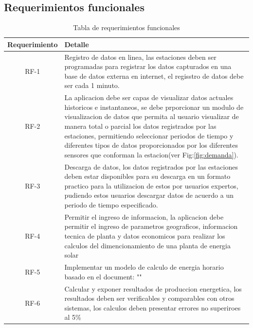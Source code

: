 \subsection{Requerimientos funcionales}
\begin{table}[h!]
\caption{Tabla de requerimientos funcionales}
\begin{tabular}{| c | p{11cm} |}
	\hline
	\textbf{Requerimiento}	&	\textbf{Detalle}	\\
	\hline
	RF-1	&	Registro de datos en linea, las estaciones deben ser programadas para registrar los datos capturados en una base de datos externa en internet, el regisstro de datos debe ser cada 1 minuto.	\\
	\hline
	RF-2	&	La aplicacion debe ser capas de visualizar datos actuales historicos e instantaneos, se debe prporcionar un modulo de visualizacion de datos que permita al usuario visualizar de manera total o parcial los datos registrados por las estaciones, permitiendo seleccionar periodos de tiempo y diferentes tipos de datos proporcionados por los diferentes sensores que conforman la estacion(ver Fig:\ref{fig:demanda}). 	\\
	\hline
	RF-3	&	Descarga de datos, los datos registrados por las estaciones deben estar disponibles para su descarga en un formato practico para la utilizacion de estos por usuarios expertos, pudiendo estos usuarios descargar datos de acuerdo a un periodo de tiempo especificado.	\\
	\hline
	RF-4	&	Permitir el ingreso de informacion, la aplicacion debe permitir el ingreso de parametros geograficos, informacion tecnica de planta y datos economicos para realizar los calculos del dimencionamiento de una planta de energia solar 	\\
	\hline
	RF-5	&	Implementar un modelo de calculo de energia horario basado en el document: ""	\\
	\hline
	RF-6	&	Calcular y exponer resultados de produccion energetica, los resultados deben ser verificables y comparables con otros sistemas, los calculos deben presentar errores no superiroes al 5\%	\\
	\hline
\end{tabular}
\end{table}

